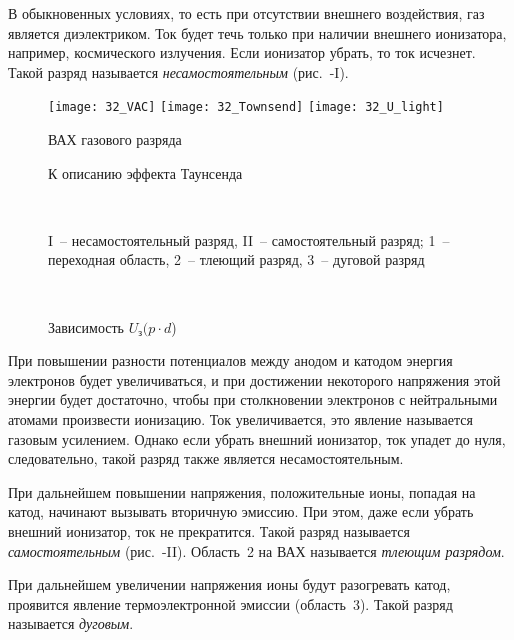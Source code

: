 
В обыкновенных условиях, то есть при отсутствии внешнего воздействия, газ
является диэлектриком. Ток будет течь только при наличии внешнего ионизатора,
например, космического излучения. Если ионизатор убрать, то ток исчезнет. Такой
разряд называется \emph{несамостоятельным} (рис.~-I).
\begin{figure}[h!]
  \center
  \texttt{[image: 32\_VAC]} \hspace{1em}
  \texttt{[image: 32\_Townsend]} \hspace{1em}
  \texttt{[image: 32\_U\_light]} \\
  \parbox{.3\textwidth}{\caption{ВАХ газового разряда} \label{pic32VAC}}
    \hspace{1em}
  \parbox{.3\textwidth}{\caption{К описанию эффекта Таунсенда}
    \label{pic32Townsend}} \hspace{1em}
  \parbox{.3\textwidth}{\caption{Зависимость \( U_\text{з}(p \cdot d\))}
    \label{pic32U}} \\
  \parbox{.37\textwidth}{\footnotesize I~-- несамостоятельный разряд,
    II~-- самостоятельный разряд; 1~-- переходная область, 2~-- тлеющий
    разряд, 3~-- дуговой разряд}
  \parbox{.62\textwidth}{\ }
\end{figure}

При повышении разности потенциалов между анодом и катодом энергия электронов
будет увеличиваться, и при достижении некоторого напряжения этой энергии будет
достаточно, чтобы при столкновении электронов с нейтральными атомами произвести
ионизацию. Ток увеличивается, это явление называется газовым усилением. Однако
если убрать внешний ионизатор, ток упадет до нуля, следовательно, такой разряд
также является несамостоятельным.

При дальнейшем повышении напряжения, положительные ионы, попадая на катод,
начинают вызывать вторичную эмиссию. При этом, даже если убрать внешний
ионизатор, ток не прекратится. Такой разряд называется \emph{самостоятельным}
(рис.~-II). Область~2 на ВАХ называется \emph{тлеющим разрядом}.

При дальнейшем увеличении напряжения ионы будут разогревать катод, проявится
явление термоэлектронной эмиссии (область~3). Такой разряд называется
\emph{дуговым}.


